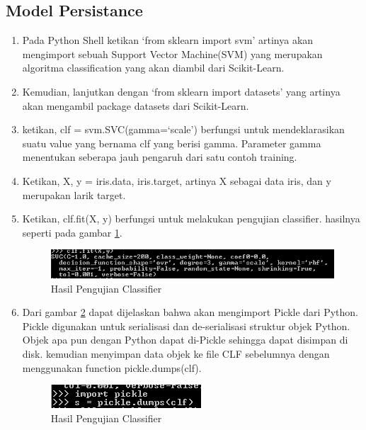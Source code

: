 \subsection{Model Persistance}
\begin{enumerate}
\item Pada Python Shell ketikan `from sklearn import svm' artinya akan mengimport sebuah Support Vector Machine(SVM) yang merupakan algoritma classification yang akan diambil dari Scikit-Learn.
\item Kemudian, lanjutkan dengan `from sklearn import datasets' yang artinya akan mengambil package datasets dari Scikit-Learn.
\item ketikan, clf = svm.SVC(gamma=`scale') berfungsi untuk mendeklarasikan suatu value yang bernama clf yang berisi gamma. Parameter gamma menentukan seberapa jauh pengaruh dari satu contoh training.
\item Ketikan, X, y = iris.data, iris.target, artinya X sebagai data iris, dan y merupakan larik target.
\item Ketikan, clf.fit(X, y) berfungsi untuk melakukan pengujian classifier. hasilnya seperti pada gambar \ref{gambar6}.
\begin{figure}
	\begin{center}
   	 \includegraphics[scale=0.7]{figures/tasya7.png}
   	 \caption{Hasil Pengujian Classifier}
     \label{gambar6}	
	\end{center}
\end{figure}

\item Dari gambar \ref{gambar7} dapat dijelaskan bahwa akan mengimport Pickle dari Python. Pickle digunakan untuk serialisasi dan de-serialisasi struktur objek Python. Objek apa pun dengan Python dapat di-Pickle sehingga dapat disimpan di disk. kemudian menyimpan data objek ke file CLF sebelumnya dengan menggunakan function pickle.dumps(clf).
\begin{figure}
	\begin{center}
   	 \includegraphics[scale=1]{figures/tasya8.png}
   	 \caption{Hasil Pengujian Classifier}
     \label{gambar7}	
	\end{center}
\end{figure}


\end{enumerate}
